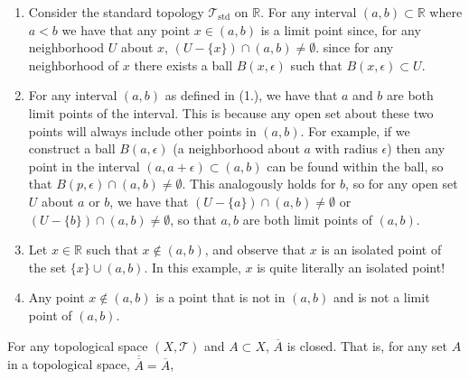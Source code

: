 \documentclass[letterpaper,12pt,twoside]{maths}
\begin{document}
\begin{solution}
\begin{enumerate}
    \item Consider the standard topology $\mathscr{T}_{\text{std}}$ on
    $\mathbb{R}$. For any interval $(a,b) \subset \mathbb{R}$ where $a < b$ we have
    that any point $x \in (a,b)$ is a limit point since, for any
    neighborhood $U$ about $x$, $(U - \{x\}) \cap (a,b) \ne
    \emptyset$.
    since for any
    neighborhood of $x$ there exists a ball $B(x, \epsilon)$ such that
    $B(x, \epsilon) \subset U$.
    
    \item For any interval $(a,b)$ as defined in (1.), we have that $a$ and
    $b$ are both limit points of the interval. This is because any open
    set about these two points will always include other points in
    $(a,b)$. For example, if we construct a ball $B(a, \epsilon)$ (a
    neighborhood about $a$ with radius $\epsilon$) then any point in the
    interval $(a, a + \epsilon) \subset (a,b)$ can be found within the
    ball, so that $B(p, \epsilon) \cap (a, b) \ne \emptyset$. 
    This analogously holds for $b$, so
    for any open set $U$ about $a$ or $b$, we have that $(U -
    \{a\}) \cap (a,b) \ne \emptyset$ or $(U - \{b\}) \cap (a,b) \ne
    \emptyset$, so that $a,b$ are both limit points of $(a,b)$.

    \item Let $x \in \mathbb{R}$ such that $x \notin (a,b)$, and observe
    that $x$ is an isolated point of the set $\{x\} \cup (a,b)$. In this
    example, $x$ is quite literally an isolated point!

    \item Any point $x
    \notin (a,b)$ is a point that is not in $(a,b)$ and is not a limit
    point of $(a,b)$. 
\end{enumerate} 
\end{solution}
       
\begin{problem}[Theorem 3.13] For any topological space $(X,
    \mathscr{T})$ and $A \subset X$, $\overline{A}$ is closed. That
    is, for any set $A$ in a topological space,
    $\overline{\overline{A}} = \overline{A}$, 
\end{problem}
\end{document}
